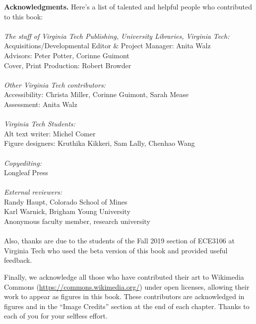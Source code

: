 {\bf Acknowledgments.}
Here's a list of talented and helpful people who contributed to this book:\\
~\\
\emph{The staff of Virginia Tech Publishing, University Libraries, Virginia Tech:}\\
Acquisitions/Developmental Editor \& Project Manager: Anita Walz\\
Advisors: Peter Potter, Corinne Guimont\\
Cover, Print Production: Robert Browder\\
~\\
\emph{Other Virginia Tech contributors:}\\
Accessibility: Christa Miller, Corinne Guimont, Sarah Mease\\
Assessment: Anita Walz\\
~\\
\emph{Virginia Tech Students:}\\
Alt text writer: Michel Comer\\
Figure designers: Kruthika Kikkeri, Sam Lally, Chenhao Wang\\
~\\
\emph{Copyediting:}\\
Longleaf Press\\
~\\
\emph{External reviewers:}\\
Randy Haupt, Colorado School of Mines\\
Karl Warnick, Brigham Young University\\
Anonymous faculty member, research university\\
~\\
Also, thanks are due to the students of the Fall 2019 section of ECE3106 at Virginia Tech who used the beta version of this book and provided useful feedback. 

Finally, we acknowledge all those who have contributed their art to Wikimedia Commons (\url{https://commons.wikimedia.org/}) under open licenses, allowing their work to appear as figures in this book.  These contributors are acknowledged in figures and in the ``Image Credits'' section at the end of each chapter. Thanks to each of you for your selfless effort. 
